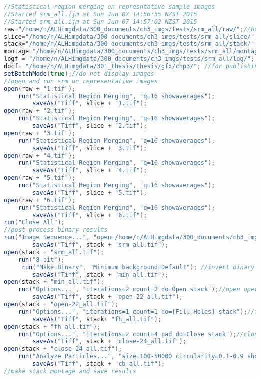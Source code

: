\begin{lstlisting}[language=java, caption=Region merging on variable nest images.., label=cd:threshold-variable-srm]
//Statistical region merging on represntative sample images
//Started srm_all.ijm at Sun Jun 07 14:56:55 NZST 2015
//Started srm_all.ijm at Sun Jun 07 14:57:02 NZST 2015
raw="/home/n/ALHimgdata/300_documents/ch3_imgs/tests/srm_all/raw/";//home dir 
slice="/home/n/ALHimgdata/300_documents/ch3_imgs/tests/srm_all/slice/"; 
stack="/home/n/ALHimgdata/300_documents/ch3_imgs/tests/srm_all/stack/"; 
montage="/home/n/ALHimgdata/300_documents/ch3_imgs/tests/srm_all/montage/"; 
logf = "/home/n/ALHimgdata/300_documents/ch3_imgs/tests/srm_all/log/"; 
docf= "/home/n/ALHimgdata/301_thesis/thesis/gfx/chp3/"; //for publishing images
setBatchMode(true);//do not display images
//open and run srm on representative images
open(raw + "1.tif");
	run("Statistical Region Merging", "q=16 showaverages");
		saveAs("Tiff", slice + "1.tif");
open(raw + "2.tif");
	run("Statistical Region Merging", "q=16 showaverages");
		saveAs("Tiff", slice + "2.tif");
open(raw + "3.tif");
	run("Statistical Region Merging", "q=16 showaverages");
		saveAs("Tiff", slice + "3.tif");
open(raw + "4.tif");
	run("Statistical Region Merging", "q=16 showaverages");
		saveAs("Tiff", slice + "4.tif"); 
open(raw + "5.tif");
	run("Statistical Region Merging", "q=16 showaverages");
		saveAs("Tiff", slice + "5.tif");
open(raw + "6.tif");
	run("Statistical Region Merging", "q=16 showaverages");
		saveAs("Tiff", slice + "6.tif"); 
run("Close All");
//post-process binary results
run("Image Sequence...", "open=/home/n/ALHimgdata/300_documents/ch3_imgs/tests/srm_all/slice/1.tif sort");
		saveAs("Tiff", stack + "srm_all.tif");
open(stack + "srm_all.tif");
	run("8-bit"); 
	 run("Make Binary", "Minimum background=Default"); //invert binary 
    	saveAs("Tiff", stack + "min_all.tif");
open(stack + "min_all.tif");
	run("Options...", "iterations=2 count=2 do=Open stack");//open operator
		saveAs("Tiff", stack + "open-22_all.tif");
open(stack + "open-22_all.tif");
	run("Options...", "iterations=1 count=1 do=[Fill Holes] stack");//fill holes
		saveAs("Tiff", stack+ "fh_all.tif");
open(stack + "fh_all.tif");
	run("Options...", "iterations=2 count=4 pad do=Close stack");//close operator
		saveAs("Tiff", stack + "close-24_all.tif");
open(stack + "close-24_all.tif");
	run("Analyze Particles...", "size=100-50000 circularity=0.1-0.9 show=Outlines display clear summarize in_situ stack"); //particle count
		saveAs("Tiff", stack + "cb_all.tif");
//make stack montage and save results

\end{lstlisting}
